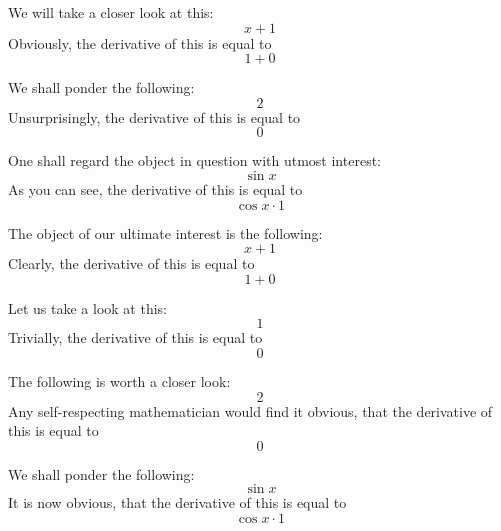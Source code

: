\documentclass{article}
\begin{document}
We will take a closer look at this:
\begin{equation}
x + 1 
\end{equation}
Obviously, the derivative of this is equal to
\begin{equation}
1 + 0 
\end{equation}

We shall ponder the following:
\begin{equation}
2 
\end{equation}
Unsurprisingly, the derivative of this is equal to
\begin{equation}
0 
\end{equation}

One shall regard the object in question with utmost interest:
\begin{equation}
\sin x 
\end{equation}
As you can see, the derivative of this is equal to
\begin{equation}
\cos x \cdot 1 
\end{equation}

The object of our ultimate interest is the following:
\begin{equation}
x + 1 
\end{equation}
Clearly, the derivative of this is equal to
\begin{equation}
1 + 0 
\end{equation}

Let us take a look at this:
\begin{equation}
1 
\end{equation}
Trivially, the derivative of this is equal to
\begin{equation}
0 
\end{equation}

The following is worth a closer look:
\begin{equation}
2 
\end{equation}
Any self-respecting mathematician would find it obvious, that the derivative of this is equal to
\begin{equation}
0 
\end{equation}

We shall ponder the following:
\begin{equation}
\sin x 
\end{equation}
It is now obvious, that the derivative of this is equal to
\begin{equation}
\cos x \cdot 1 
\end{equation}
\end{document}
